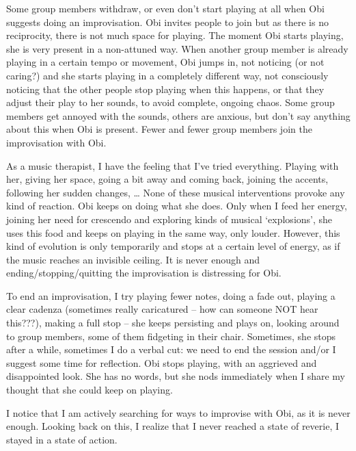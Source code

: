 \documentclass[authordate, empirical]{jote-new-article}
\begin{document}
Some group members withdraw, or even don't start playing at all when Obi suggests doing an improvisation. Obi invites people to join but as there is no reciprocity, there is not much space for playing. The moment Obi starts playing, she is very present in a non-attuned way. When another group member is already playing in a certain tempo or movement, Obi jumps in, not noticing (or not caring?) and she starts playing in a completely different way, not consciously noticing that the other people stop playing when this happens, or that they adjust their play to her sounds, to avoid complete, ongoing chaos. Some group members get annoyed with the sounds, others are anxious, but don't say anything about this when Obi is present. Fewer and fewer group members join the improvisation with Obi.



As a music therapist, I have the feeling that I've tried everything. Playing with her, giving her space, going a bit away and coming back, joining the accents, following her sudden changes, … None of these musical interventions provoke any kind of reaction. Obi keeps on doing what she does. Only when I feed her energy, joining her need for crescendo and exploring kinds of musical ‘explosions', she uses this food and keeps on playing in the same way, only louder. However, this kind of evolution is only temporarily and stops at a certain level of energy, as if the music reaches an invisible ceiling. It is never enough and ending/stopping/quitting the improvisation is distressing for Obi.



To end an improvisation, I try playing fewer notes, doing a fade out, playing a clear cadenza (sometimes really caricatured -- how can someone NOT hear this???), making a full stop -- she keeps persisting and plays on, looking around to group members, some of them fidgeting in their chair. Sometimes, she stops after a while, sometimes I do a verbal cut: we need to end the session and/or I suggest some time for reflection. Obi stops playing, with an aggrieved and disappointed look. She has no words, but she nods immediately when I share my thought that she could keep on playing.



I notice that I am actively searching for ways to improvise with Obi, as it is never enough. Looking back on this, I realize that I never reached a state of reverie, I stayed in a state of action.
\end{document}
